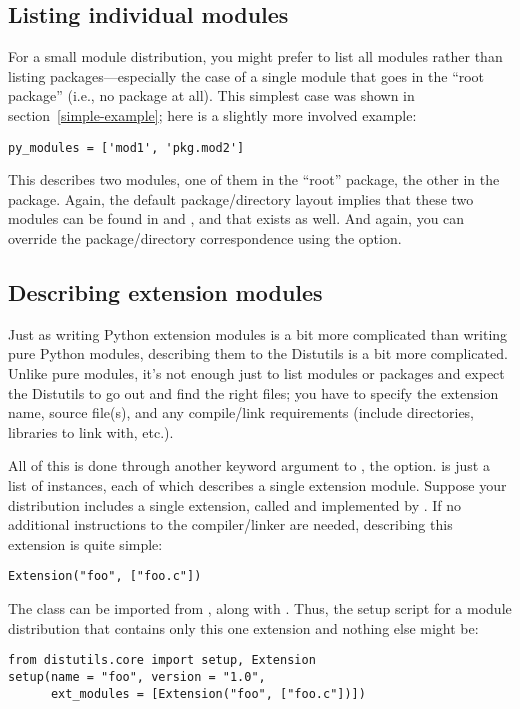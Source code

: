 \documentclass{howto}
\begin{document}
\subsection{Listing individual modules}
\label{listing-modules}

For a small module distribution, you might prefer to list all modules
rather than listing packages---especially the case of a single module
that goes in the ``root package'' (i.e., no package at all).  This
simplest case was shown in section~\ref{simple-example}; here is a
slightly more involved example:
\begin{verbatim}
py_modules = ['mod1', 'pkg.mod2']
\end{verbatim}
This describes two modules, one of them in the ``root'' package, the
other in the  package.  Again, the default package/directory
layout implies that these two modules can be found in  and
, and that  exists as well.
And again, you can override the package/directory correspondence using
the  option.


\subsection{Describing extension modules}
\label{describing-extensions}

Just as writing Python extension modules is a bit more complicated than
writing pure Python modules, describing them to the Distutils is a bit
more complicated.  Unlike pure modules, it's not enough just to list
modules or packages and expect the Distutils to go out and find the
right files; you have to specify the extension name, source file(s), and
any compile/link requirements (include directories, libraries to link
with, etc.).

All of this is done through another keyword argument to
, the  option.  
is just a list of  instances, each of which describes a
single extension module.  Suppose your distribution includes a single
extension, called  and implemented by .  If no
additional instructions to the compiler/linker are needed, describing
this extension is quite simple:
\begin{verbatim}
Extension("foo", ["foo.c"])
\end{verbatim}
The  class can be imported from
, along with .  Thus, the setup
script for a module distribution that contains only this one extension
and nothing else might be:
\begin{verbatim}
from distutils.core import setup, Extension
setup(name = "foo", version = "1.0",
      ext_modules = [Extension("foo", ["foo.c"])])
\end{verbatim}
\end{document}

